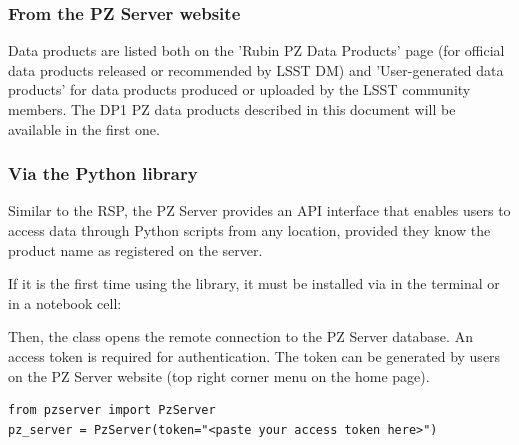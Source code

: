 \subsubsection{From the PZ Server website} 

Data products are listed both on the 'Rubin PZ Data Products' page (for official data products released or recommended by LSST DM) and 'User-generated data products' for data products produced or uploaded by the LSST community members. The DP1 PZ data products described in this document
will be 
available in the first one. %


\subsubsection{Via the  Python library}

Similar to the RSP, the PZ Server provides an API interface that enables users to access data through Python scripts from any location, provided they know the product name as registered on the server. 
 
If it is the first time using the library, it must be installed via  in the terminal or in a notebook cell: 

Then, the  class opens the remote connection to the PZ Server database. An access token is required for authentication. The token can be generated by users on the PZ Server website (top right corner menu on the home page).    

\begin{verbatim}
from pzserver import PzServer
pz_server = PzServer(token="<paste your access token here>")  
\end{verbatim}

